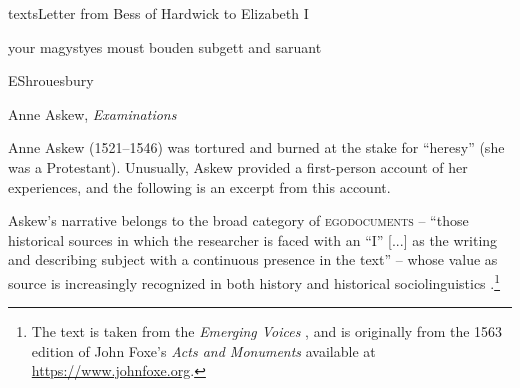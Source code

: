 \begin{texts}{texts}{Letter from Bess of Hardwick to Elizabeth I}
\begin{textglossed}
    your magystyes moust bouden subgett and saruant

    EShrouesbury
\end{textglossed}

\end{texts}
\begin{texts}{Anne Askew, \emph{Examinations}}\label{Askew}

Anne Askew (1521--1546) was tortured and burned at the stake for ``heresy'' (she was a Protestant). Unusually, Askew provided a first-person account of her experiences, and the following is an excerpt from this account.

Askew's narrative belongs to the broad category of \textsc{egodocuments} -- ``those historical sources in which the researcher is faced with an ``I'' [...] as the writing and describing subject with a continuous presence in the text'' \citep{Presser1958} -- whose value as source is increasingly recognized in both history and historical sociolinguistics \citep{vanderWalRutten2013,MascuchDekkerBaggerman2016}.\footnote{The text is taken from the \emph{Emerging Voices}  \citep{Walkden2019}, and is originally from the 1563 edition of John Foxe's \emph{Acts and Monuments} available at \url{https://www.johnfoxe.org}.}


\end{texts}
